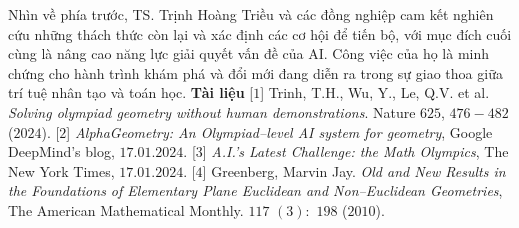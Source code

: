 \begin{multicols}{2}
	\vskip 0.1cm
	Nhìn về phía trước, TS. Trịnh Hoàng Triều và các đồng nghiệp cam kết nghiên cứu những thách thức còn lại và xác định các cơ hội để tiến bộ, với mục đích cuối cùng là nâng cao năng lực giải quyết vấn đề của AI. Công việc của họ là minh chứng cho hành trình khám phá và đổi mới đang diễn ra trong sự giao thoa giữa trí tuệ nhân tạo và toán học.
	\vskip 0.1cm
	\textbf{\color{timhieukhoahoc}Tài liệu}
	\vskip 0.1cm
	[$1$] Trinh, T.H., Wu, Y., Le, Q.V. et al. \textit{Solving olympiad geometry without human demonstrations}. Nature $625$, $476-482$ ($2024$).
	\vskip 0.1cm
	[$2$] \textit{AlphaGeometry: An Olympiad--level AI system for geometry}, Google DeepMind's blog, $17.01.2024$.
	\vskip 0.1cm
	[$3$] \textit{A.I.’s Latest Challenge: the Math Olympics}, The New York Times, $17.01.2024$.
	\vskip 0.1cm
	[$4$] Greenberg, Marvin Jay. \textit{Old and New Results in the Foundations of Elementary Plane Euclidean and Non--Euclidean Geometries}, The American Mathematical Monthly. $117$ $(3):$ $198$ ($2010$).
\end{multicols}


